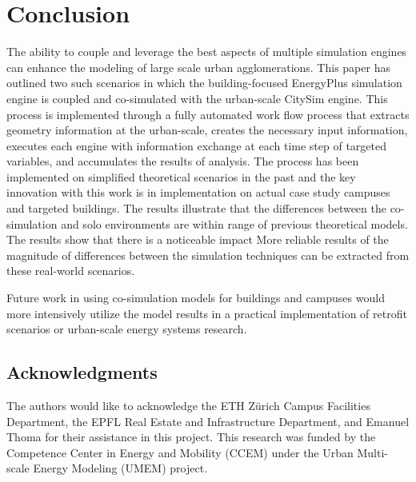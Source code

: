 \documentclass{tBPS2e}
\theoremstyle{plain}
\theoremstyle{definition}
\theoremstyle{remark}
\newcommand{\noteDT}[1]{\footnote{\textcolor{green}{#1}}}
\begin{document}


\section{Conclusion}
The ability to couple and leverage the best aspects of multiple simulation
engines can enhance the modeling of large scale urban agglomerations. This
paper has outlined two such scenarios in which the building-focused EnergyPlus
simulation engine is coupled and co-simulated with the urban-scale CitySim
engine. This process is implemented through a fully automated work flow
process that extracts geometry information at the
urban-scale, creates the necessary input information, executes each engine
with information exchange at each time step of targeted variables, and
accumulates the results of analysis. The process has been implemented on
simplified theoretical scenarios in the past and the key innovation with this
work is in implementation on actual case study campuses and targeted
buildings. The results illustrate that the differences between the co-
simulation and solo environments are within range of previous theoretical
models. The results show that there is a noticeable impact 
More reliable results of the magnitude of differences between the
simulation techniques can be extracted from these real-world scenarios. 

Future work in using co-simulation models for buildings and campuses would
more intensively utilize the model results in a practical implementation of
retrofit scenarios or urban-scale energy systems research.

\subsection{Acknowledgments}
The authors would like to acknowledge the ETH Z\"urich Campus Facilities
Department, the EPFL Real Estate and Infrastructure Department, and Emanuel
Thoma for their assistance in this project. This research was funded by the
Competence Center in Energy and Mobility (CCEM) under the Urban Multi-scale
Energy Modeling (UMEM) project. 



\end{document}
